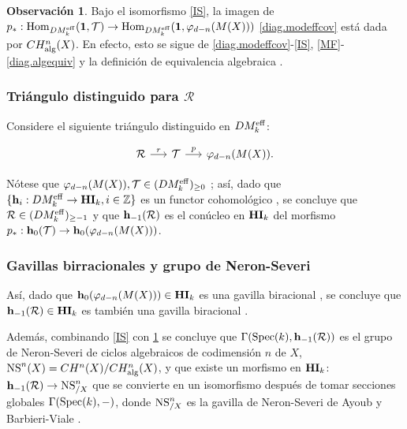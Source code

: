 \documentclass[10pt]{amsart}
\theoremstyle{definition}
\newtheorem{obs}[definition]{Observaci\'on}
\theoremstyle{remark}
\theoremstyle{definition}
\begin{document}
\begin{obs}\label{OBS}
Bajo el isomorfismo \ref{IS}, la imagen de $p_{*}:{\rm Hom}_{DM_{k}^{\rm eff}}({\bf 1},\mathcal{T})\to{\rm Hom}_{DM_{k}^{\rm eff}}({\bf 1},\varphi_{d-n}(M(X)))$  \ref{diag.modeffcov} está dada por $CH^{n}_{\rm{alg}}(X)$. En efecto, esto se sigue de \ref{diag.modeffcov}-\ref{IS}, \ref{MF}-\ref{diag.algequiv} y la definición de equivalencia algebraica \cite[§2.2]{Sam60}.
\end{obs}

\subsubsection{Triángulo distinguido para $\mathcal{R}$}\label{TRID} Considere el siguiente triángulo distinguido en $DM_{k}^{\rm eff}$:

\begingroup{}\label{tri}
\[
\begin{tikzcd}[column sep=15pt]
\mathcal{R}\arrow[r, "r"] & \mathcal{T}\arrow[r, "p"] & \varphi_{d-n}(M(X)).
\end{tikzcd}
\]
\endgroup




Nótese que $\varphi_{d-n}(M(X)),\mathcal{T}\in(DM_{k}^{\rm eff})_{\geq 0}$ \cite[5.1.4]{PR25}; así, dado que $\{{\bf h}_{i}:DM_{k}^{\rm eff}\to{\bf H}{\bf I}_{k},i\in\mathbb{Z}\}$ es un functor cohomológico \cite[Thm. 1.3.6]{BBD82}, se concluye que $\mathcal{R}\in(DM_{k}^{\rm eff})_{\geq-1}$ y que ${\bf h}_{-1}(\mathcal{R})$ es el conúcleo en ${\bf H}{\bf I}_{k}$ del morfismo $p_{*}:{\bf h}_{0}(\mathcal{T})\to{\bf h}_{0}(\varphi_{d-n}(M(X)))$.

\subsubsection{Gavillas birracionales y grupo de Neron-Severi}\label{GB} Así, dado que ${\bf h}_{0}(\varphi_{d-n}(M(X)))\in{\bf H}{\bf I}_{k}$ es una gavilla biracional \cite[5.1.5]{PR25}, se concluye que ${\bf h}_{-1}(\mathcal{R})\in{\bf H}{\bf I}_{k}$ es también una gavilla biracional \cite[Prop. 2.6.2]{KS17}.

Además, combinando \ref{IS} con \ref{OBS} se concluye que $\Gamma({\rm Spec}(k),{\bf h}_{-1}(\mathcal{R}))$ es el grupo de Neron-Severi de ciclos algebraicos de codimensión $n$ de $X$, ${\rm NS}^{n}(X)=CH^{n}(X)/CH^{n}_{\rm{alg}}(X)$, y que existe un morfismo en ${\bf H}{\bf I}_{k}$: ${\bf h}_{-1}(\mathcal{R})\to{\rm NS}^{n}_{/X}$ que se convierte en un isomorfismo después de tomar secciones globales $\Gamma({\rm Spec}(k),-)$, donde ${\rm NS}^{n}_{/X}$ es la gavilla de Neron-Severi de Ayoub y Barbieri-Viale \cite[Def. 3.1.2]{ABV09}.
\end{document}
